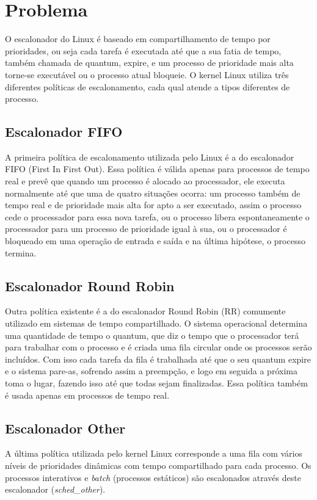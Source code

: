 \documentclass[a4paper,12pt]{article}
\begin{document}
\section{Problema}
O escalonador do Linux é baseado em compartilhamento de tempo por prioridades, ou seja cada tarefa é executada até que a sua fatia de tempo, também chamada de quantum, expire, e um processo de prioridade mais alta torne-se executável ou o processo atual bloqueie. O kernel Linux utiliza três diferentes políticas de escalonamento, cada qual atende a tipos diferentes de processo.

\subsection{Escalonador FIFO}
A primeira política de escalonamento utilizada pelo Linux é a do escalonador FIFO (First In First Out). Essa política é válida apenas para processos de tempo real e prevê que quando um processo é alocado ao processador, ele executa normalmente até que uma de quatro situações ocorra: um processo também de tempo real e de prioridade mais alta for apto a ser executado, assim o processo cede o processador para essa nova tarefa, ou o processo libera espontaneamente o processador para um processo de prioridade igual à sua, ou o processador é bloqueado em uma operação de entrada e saída e na última hipótese, o processo termina. \cite{Oliveira2008}

\subsection{Escalonador Round Robin}
Outra política existente é a do escalonador Round Robin (RR) comumente utilizado em sistemas de tempo compartilhado. O sistema operacional determina uma quantidade de tempo o quantum, que diz o tempo que o processador terá para trabalhar com o processo e é criada uma fila circular onde os processos serão incluídos. Com isso cada tarefa da fila é trabalhada até que o seu quantum expire e o sistema pare-as, sofrendo assim a preempção, e logo em seguida a próxima toma o lugar, fazendo isso até que todas sejam finalizadas. Essa política também é usada apenas em processos de tempo real. \cite{Deitel2006}

\subsection{Escalonador Other}
A última política utilizada pelo kernel Linux corresponde a uma fila com vários níveis de prioridades dinâmicas com tempo compartilhado para cada processo. Os processos interativos e \emph{batch} (processos estáticos) são escalonados através deste escalonador (\emph{sched\_other}).
\end{document}
